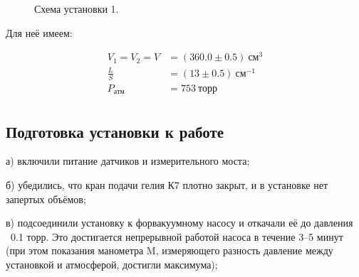 \documentclass[a4paper, 10pt, twocolumn]{article}
\begin{document}
\begin{figure}[ht]
    \caption{Схема установки 1.}
    \label{ustanovka}
\end{figure}

Для неё имеем:

\begin{align*}
    V_1 = V_2 = V &= (360.0 \pm 0.5)~\text{см}^3\\
    \frac{L}{S} &= (13 \pm 0.5)~\text{см}^{-1}\\
    P_{атм} &= 753 ~\text{торр}\\
\end{align*}

\subsection{Подготовка установки к работе}
а) включили питание датчиков и измерительного моста;

б) убедились, что кран подачи гелия К7 плотно закрыт, и в установке нет
запертых объёмов;

в) подсоединили установку к форвакуумному насосу и откачали её до давления
~0.1 торр. Это достигается непрерывной работой насоса в течение
3–5 минут (при этом показания манометра M, измеряющего разность
давление между установкой и атмосферой, достигли максимума);
\end{document}
